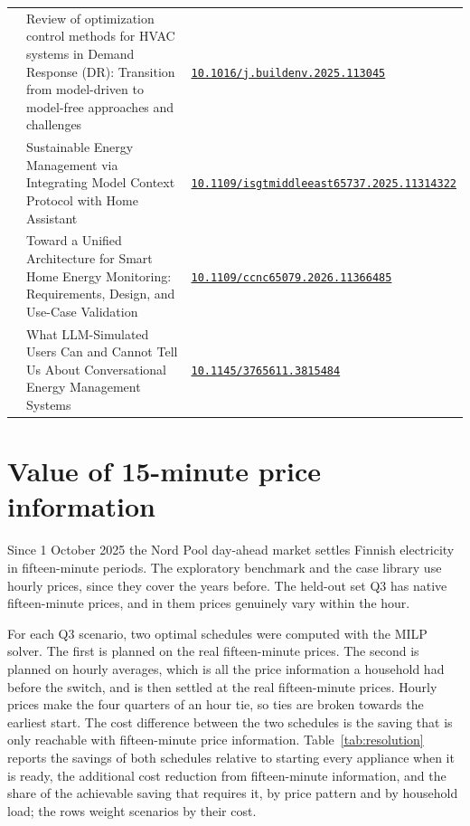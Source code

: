 \documentclass[12pt,a4paper]{report}
\begin{document}
{\begin{longtable}{>{\raggedright\arraybackslash}p{}>{\raggedright\arraybackslash}p{}>{\raggedright\arraybackslash}p{}}
2025 & Review of optimization control methods for HVAC systems in Demand Response (DR): Transition from model-driven to model-free approaches and challenges & \href{https://doi.org/10.1016/j.buildenv.2025.113045}{\nolinkurl{10.1016/j.buildenv.2025.113045}} \\[3pt]
2025 & Sustainable Energy Management via Integrating Model Context Protocol with Home Assistant & \href{https://doi.org/10.1109/isgtmiddleeast65737.2025.11314322}{\nolinkurl{10.1109/isgtmiddleeast65737.2025.11314322}} \\[3pt]
2026 & Toward a Unified Architecture for Smart Home Energy Monitoring: Requirements, Design, and Use-Case Validation & \href{https://doi.org/10.1109/ccnc65079.2026.11366485}{\nolinkurl{10.1109/ccnc65079.2026.11366485}} \\[3pt]
2026 & What LLM-Simulated Users Can and Cannot Tell Us About Conversational Energy Management Systems & \href{https://doi.org/10.1145/3765611.3815484}{\nolinkurl{10.1145/3765611.3815484}} \\[3pt]
\end{longtable}
}

\chapter{Value of 15-minute price information}
\label{sec:resolution}

Since 1 October 2025 the Nord Pool day-ahead market settles Finnish
electricity in fifteen-minute periods. The exploratory benchmark and the
case library use hourly prices, since they cover the years before. The
held-out set Q3 has native fifteen-minute prices, and in them prices
genuinely vary within the hour.

For each Q3 scenario, two optimal schedules were computed with the MILP
solver. The first is planned on the real fifteen-minute prices. The
second is planned on hourly averages, which is all the price information
a household had before the switch, and is then settled at the real
fifteen-minute prices. Hourly prices make the four quarters of an hour
tie, so ties are broken towards the earliest start. The cost difference
between the two schedules is the saving that is only reachable with
fifteen-minute price information. Table~\ref{tab:resolution} reports the
savings of both schedules relative to starting every appliance when it
is ready, the additional cost reduction from fifteen-minute information,
and the share of the achievable saving that requires it, by price
pattern and by household load; the rows weight scenarios by their cost.
\end{document}
